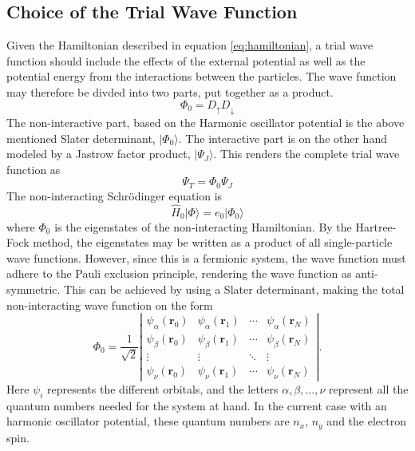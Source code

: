 \documentclass[aps,prb,twocolumn,floatfix]{revtex4}
\renewcommand{\vec}{\mathbf}
\begin{document}
\subsection{Choice of the Trial Wave Function} \label{sec:wavefunction}

Given the Hamiltonian described in equation \ref{eq:hamiltonian}, a trial wave function should include the effects of the external potential as well as the potential energy from the interactions between the particles. The wave function may therefore be divded into two parts, put together as a product.
\begin{equation}
    \Phi_0 = D_{\uparrow} D_{\downarrow}
\end{equation}
The non-interactive part, based on the Harmonic oscillator potential is the above mentioned Slater determinant, $|\Phi_0\rangle$. The interactive part is on the other hand modeled by a Jastrow factor product, $|\Psi_J\rangle$. This renders the complete trial wave function as
\begin{equation}
    \Psi_T = \Phi_0\Psi_J
\end{equation}
The non-interacting Schrödinger equation is
\begin{equation}
    \hat H_0 |\Phi \rangle = e_0 | \Phi_0 \rangle
\end{equation}
where $\Phi_0$ is the eigenstates of the non-interacting Hamiltonian. By the Hartree-Fock method, the eigenstates may be written as a product of all single-particle wave functions. However, since this is a fermionic system, the wave function must adhere to the Pauli exclusion principle, rendering the wave function as anti-symmetric. This can be achieved by using a Slater determinant, making the total non-interacting wave function on the form
\begin{equation}
    \Phi_0 = \frac{1}{\sqrt{2}} \left | 
    \begin{array}{cccc}
        \psi_\alpha(\vec r_0) & \psi_\alpha(\vec r_1) & \cdots &  \psi_\alpha(\vec r_N) \\
        \psi_\beta(\vec r_0) & \psi_\beta(\vec r_1) & \cdots &  \psi_\beta(\vec r_N) \\
        \vdots & \vdots & \ddots & \vdots \\
        \psi_\nu(\vec r_0) & \psi_\nu(\vec r_1) & \cdots &  \psi_\nu(\vec r_N)
    \end{array}
\right | .
\end{equation} 
Here $\psi_i$ represents the different orbitals, and the letters $\alpha, \beta, \ldots, \nu$ represent all the quantum numbers needed for the system at hand. In the current case with an harmonic oscillator potential, these quantum numbers are $n_x$, $n_y$ and the electron spin.
\end{document}

